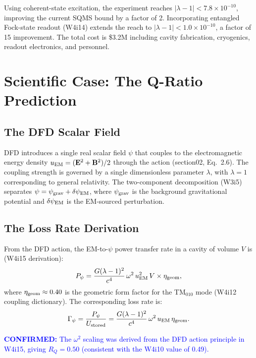 \documentclass[11pt]{article}
\newcommand{\ee}[1]{\times 10^{#1}}
\newcommand{\lbone}{|\lambda - 1|}
\newcommand{\confirmed}[1]{\textcolor{blue}{\textbf{CONFIRMED:} #1}}
\begin{document}
Using coherent-state excitation, the experiment reaches $\lbone <
7.8\ee{-10}$, improving the current SQMS bound by a factor of 2.
Incorporating entangled Fock-state readout (W4i14) extends the reach
to $\lbone < 1.0\ee{-10}$, a factor of 15 improvement. The total
cost is \$3.2M including cavity fabrication, cryogenics, readout
electronics, and personnel.


\section{Scientific Case: The Q-Ratio Prediction}

\subsection{The DFD Scalar Field}

DFD introduces a single real scalar field $\psi$ that couples to the
electromagnetic energy density $u_{\rm EM} = (\mathbf{E}^2 +
\mathbf{B}^2)/2$ through the action (section02, Eq.~2.6). The
coupling strength is governed by a single dimensionless parameter
$\lambda$, with $\lambda = 1$ corresponding to general relativity.
The two-component decomposition (W3i5) separates $\psi = \psi_{\rm
grav} + \delta\psi_{\rm EM}$, where $\psi_{\rm grav}$ is the
background gravitational potential and $\delta\psi_{\rm EM}$ is the
EM-sourced perturbation.

\subsection{The Loss Rate Derivation}

From the DFD action, the EM-to-$\psi$ power transfer rate in a cavity
of volume $V$ is (W4i15 derivation):
\begin{equation}
P_\psi = \frac{G(\lambda - 1)^2}{c^4}\,\omega^2\,u_{\rm EM}^2\,V
\times \eta_{\rm geom},
\label{eq:power}
\end{equation}
where $\eta_{\rm geom} \approx 0.40$ is the geometric form factor for
the TM$_{010}$ mode (W4i12 coupling dictionary). The corresponding
loss rate is:
\begin{equation}
\Gamma_\psi = \frac{P_\psi}{U_{\rm stored}} = \frac{G(\lambda - 1)^2}
{c^4}\,\omega^2\,u_{\rm EM}\,\eta_{\rm geom}.
\label{eq:gamma}
\end{equation}

\confirmed{The $\omega^2$ scaling was derived from the DFD action
principle in W4i15, giving $R_Q = 0.50$ (consistent with the W4i10
value of 0.49).}
\end{document}
